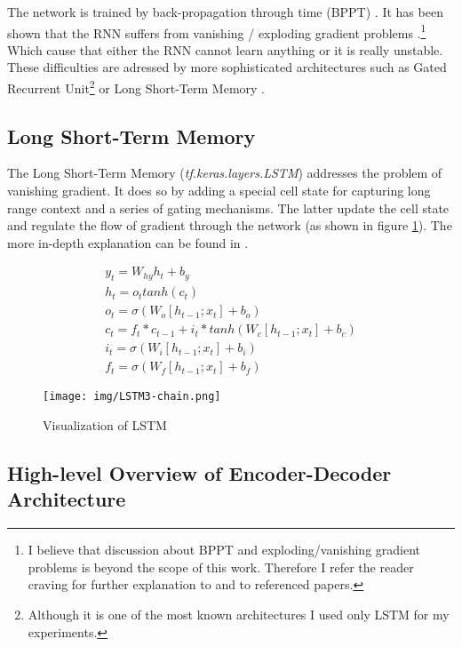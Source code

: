 The network is trained by back-propagation through time (BPPT) \citep{bpptWerbos1990}. It has been shown that the RNN suffers from vanishing / exploding gradient problems \citep{hochreiter1997}.\footnote{I believe that discussion about BPPT and exploding/vanishing gradient problems is beyond the scope of this work. Therefore I refer the reader craving for further explanation to \citep{Goodfellow-et-al-2016} and to referenced papers.} Which cause that either the RNN cannot learn anything or it is really unstable. These difficulties are adressed by more sophisticated architectures such as Gated Recurrent Unit\footnote{Although it is one of the most known architectures I used only LSTM for my experiments. } \citep{cho2014learning} or Long Short-Term Memory \citep{hochreiter1997}.


\subsection{Long Short-Term Memory}

The Long Short-Term Memory (\emph{tf.ke\-ras.lay\-ers.LSTM}) addresses the problem of vanishing gradient. It does so by adding a special cell state for capturing long range context and a series of gating mechanisms. The latter update the cell state and regulate the flow of gradient through the network (as shown in figure \ref{lstm}). The more in-depth explanation can be found in \citep{Olah2015}.

\begin{figure}[!ht]
    \begin{gather}
        y_t = W_{hy}h_t + b_y \\
        h_t = o_t tanh(c_t) \\
        o_t = \sigma(W_o[h_{t-1};x_t] + b_o) \\
        c_t = f_t * c_{t-1} + i_t * tanh(W_c[h_{t-1}; x_t] + b_c)\\
        i_t = \sigma(W_i[h_{t-1}; x_t] + b_i)\\
        f_t = \sigma(W_f[h_{t-1}; x_t] + b_f)
    \end{gather}
\end{figure}
\begin{figure}[!ht]
    \centering
    \texttt{[image: img/LSTM3-chain.png]}
    \caption{Visualization of LSTM \citep{Olah2015}} \label{lstm}
\end{figure}

\subsection{High-level Overview of Encoder-Decoder Architecture} \label{high-level_enc_dec_section}

